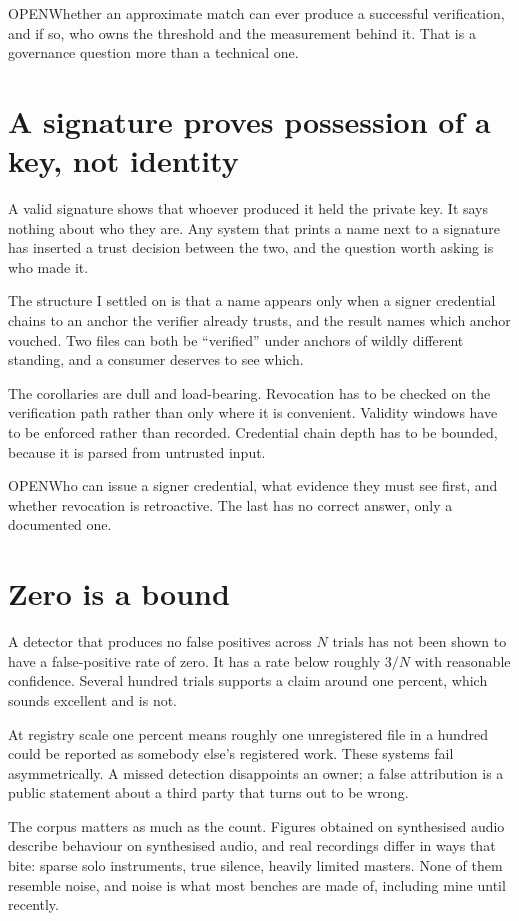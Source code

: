 \documentclass[11pt]{article}
\newcommand{\decision}[1]{%
  \par\vspace{4pt}%
  \noindent\textcolor{quiet}{\sansfont\footnotesize OPEN}\quad #1\par\vspace{2pt}}
\begin{document}
\decision{Whether an approximate match can ever produce a successful
verification, and if so, who owns the threshold and the measurement behind it.
That is a governance question more than a technical one.}

\section{A signature proves possession of a key, not identity}

A valid signature shows that whoever produced it held the private key. It says
nothing about who they are. Any system that prints a name next to a signature has
inserted a trust decision between the two, and the question worth asking is who
made it.

The structure I settled on is that a name appears only when a signer credential
chains to an anchor the verifier already trusts, and the result names which
anchor vouched. Two files can both be ``verified'' under anchors of wildly
different standing, and a consumer deserves to see which.

The corollaries are dull and load-bearing. Revocation has to be checked on the
verification path rather than only where it is convenient. Validity windows have
to be enforced rather than recorded. Credential chain depth has to be bounded,
because it is parsed from untrusted input.

\decision{Who can issue a signer credential, what evidence they must see first,
and whether revocation is retroactive. The last has no correct answer, only a
documented one.}

\section{Zero is a bound}

A detector that produces no false positives across $N$ trials has not been shown
to have a false-positive rate of zero. It has a rate below roughly $3/N$ with
reasonable confidence. Several hundred trials supports a claim around one
percent, which sounds excellent and is not.

At registry scale one percent means roughly one unregistered file in a hundred
could be reported as somebody else's registered work. These systems fail
asymmetrically. A missed detection disappoints an owner; a false attribution is a
public statement about a third party that turns out to be wrong.

The corpus matters as much as the count. Figures obtained on synthesised audio
describe behaviour on synthesised audio, and real recordings differ in ways that
bite: sparse solo instruments, true silence, heavily limited masters. None of
them resemble noise, and noise is what most benches are made of, including mine
until recently.
\end{document}
